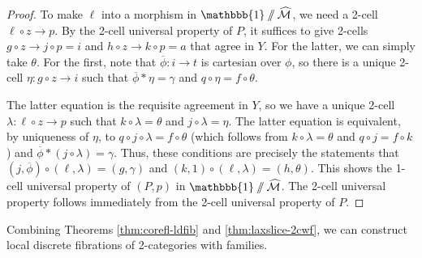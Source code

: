 \documentclass[10pt]{article}
\theoremstyle{definition}
\newcommand\Mhat{\widehat{\mathcal{M}}}
\newcommand\one{\mathbbb{1}}
\begin{document}
\begin{proof}
  To make $\ell$ into a morphism in $\one\sslash\Mhat$, we need a 2-cell $\ell \circ z \to p$.
  By the 2-cell universal property of $P$, it suffices to give 2-cells $g\circ z \to j\circ p = i$ and $h\circ z \to k \circ p = a$ that agree in $Y$.
  For the latter, we can simply take $\theta$.
  For the first, note that $\overline{\phi}:i\to t$ is cartesian over $\phi$, so there is a unique 2-cell $\eta : g \circ z \to i$ such that  $\overline{\phi} * \eta = \gamma$ and $q \circ \eta = f\circ \theta$.

  The latter equation is the requisite agreement in $Y$, so we have a unique 2-cell $\lambda:\ell \circ z \to p$ such that $k\circ \lambda = \theta$ and $j\circ \lambda = \eta$.
  The latter equation is equivalent, by uniqueness of $\eta$, to $q\circ j \circ \lambda = f\circ \theta$ (which follows from $k\circ \lambda = \theta$ and $q\circ j = f\circ k$) and $\overline{\phi} * (j\circ \lambda) = \gamma$.
  Thus, these conditions are precisely the statements that $(j,\overline{\phi})\circ (\ell,\lambda) = (g,\gamma)$  and $(k,1)\circ (\ell,\lambda) = (h,\theta)$.
  This shows the 1-cell universal property of $(P,p)$ in $\one\sslash\Mhat$.
  The 2-cell universal property follows immediately from the 2-cell universal property of $P$.
\end{proof}

Combining Theorems \ref{thm:corefl-ldfib} and \ref{thm:laxslice-2cwf}, we can construct local discrete fibrations of 2-categories with families.
\end{document}

